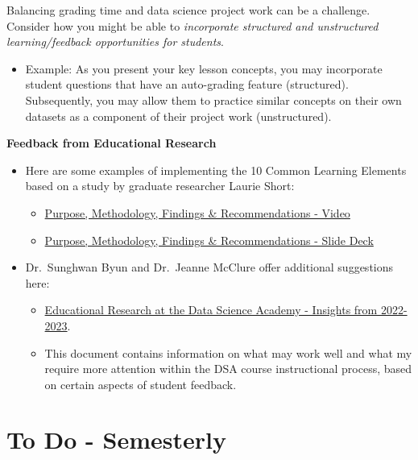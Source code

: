 \documentclass[
  letterpaper,
  DIV=11,
  numbers=noendperiod]{scrreprt}
\providecommand{\tightlist}{%
  \setlength{\itemsep}{0pt}\setlength{\parskip}{0pt}}
\begin{document}
Balancing grading time and data science project work can be a challenge.
Consider how you might be able to \emph{incorporate structured and
unstructured learning/feedback opportunities for students}.

\begin{itemize}
\tightlist
\item
  Example: As you present your key lesson concepts, you may incorporate
  student questions that have an auto-grading feature (structured).
  Subsequently, you may allow them to practice similar concepts on their
  own datasets as a component of their project work (unstructured).
\end{itemize}

\textbf{Feedback from Educational Research}

\begin{itemize}
\tightlist
\item
  Here are some examples of implementing the 10 Common Learning Elements
  based on a study by graduate researcher Laurie Short:

  \begin{itemize}
  \tightlist
  \item
    \href{https://ncsu.hosted.panopto.com/Panopto/Pages/Viewer.aspx?id=7ba115d4-d47d-412d-b9b9-b46d012e048a}{Purpose,
    Methodology, Findings \& Recommendations - Video}
  \item
    \href{https://canva.link/otpztej3nqkchla}{Purpose, Methodology,
    Findings \& Recommendations - Slide Deck}
  \end{itemize}
\item
  Dr.~Sunghwan Byun and Dr.~Jeanne McClure offer additional suggestions
  here:

  \begin{itemize}
  \tightlist
  \item
    \href{https://docs.google.com/document/d/1jRILSc0DsFm2moet9Ep8bF1suEOfHfnLzfJ2t4tIfjA/edit?usp=sharing}{Educational
    Research at the Data Science Academy - Insights from 2022-2023}.
  \item
    This document contains information on what may work well and what my
    require more attention within the DSA course instructional process,
    based on certain aspects of student feedback.
  \end{itemize}
\end{itemize}


\chapter{To Do - Semesterly}\label{to-do---semesterly}
\end{document}
